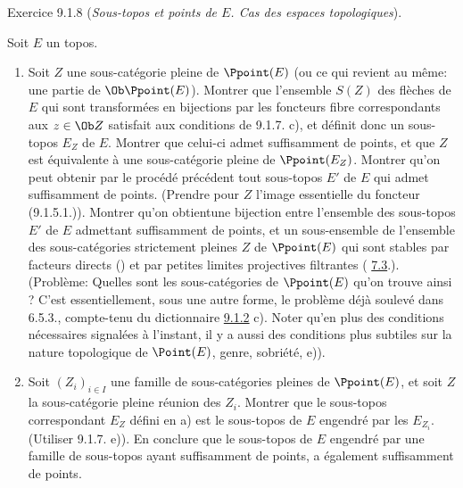 \documentclass[10pt]{../fichiers-configuration-latex/smfart}
\begin{document}
\begin{enonce*}[remark]{Exercice 9.1.8}
(\emph{Sous-topos et points de $E$. Cas des espaces topologiques}).

Soit $E$ un topos.
\begin{enumerate}
\renewcommand{\theenumi}{\alph{enumi}}
\renewcommand{\labelenumi}{\theenumi)}
\item Soit $Z$ une sous-catégorie pleine de $\Ppoint(E)$ (ou ce qui
revient au même: une partie de $\Ob \Ppoint(E)$). Montrer que
l'ensemble $S(Z)$ des flèches de $E$ qui sont transformées en
bijections par les foncteurs fibre correspondants aux $z\in \Ob Z$
satisfait aux conditions de 9.1.7. c), et définit donc un sous-topos
$E_Z$ de $E$. Montrer que celui-ci admet suffisamment de points, et
que $Z$ est équivalente à une sous-catégorie pleine de
$\Ppoint(E_Z)$. Montrer qu'on peut obtenir par le procédé précédent
tout sous-topos $E'$ de $E$ qui admet suffisamment de points.
(Prendre pour $Z$ l'image essentielle du foncteur (9.1.5.1.)).
Montrer qu'on obtient\pageoriginale une bijection entre l'ensemble
des sous-topos $E'$ de $E$ admettant suffisamment de points, et un
sous-ensemble de l'ensemble des sous-catégories strictement pleines
$Z$ de $\Ppoint(E)$ qui sont stables par facteurs directs
() et par petites limites projectives filtrantes (\cf
\hyperref[IV.subsec7.3]{7.3}.). (Problème: Quelles sont les sous-catégories de
$\Ppoint(E)$ qu'on trouve ainsi ? C'est essentiellement, sous une
autre forme, le problème déjà soulevé dans 6.5.3., compte-tenu du
dictionnaire \hyperref[IV.rem9.1.2]{9.1.2} c). Noter qu'en plus des conditions
nécessaires signalées à l'instant, il y a aussi des conditions plus
subtiles sur la nature topologique de $\Point(E)$, genre, sobriété,
\cf e)).

\item Soit $(Z_i)_{i\in I}$ une famille de sous-catégories pleines de
$\Ppoint(E)$, et soit $Z$ la sous-catégorie pleine réunion des
$Z_i$. Montrer que le sous-topos correspondant $E_Z$ défini en a)
est le sous-topos de $E$ engendré par les $E_{Z_i}$. (Utiliser
9.1.7. e)). En conclure que le sous-topos de $E$ engendré par une
famille de sous-topos ayant suffisamment de points, a également
suffisamment de points.


\end{enumerate}
\end{enonce*}
\end{document}

